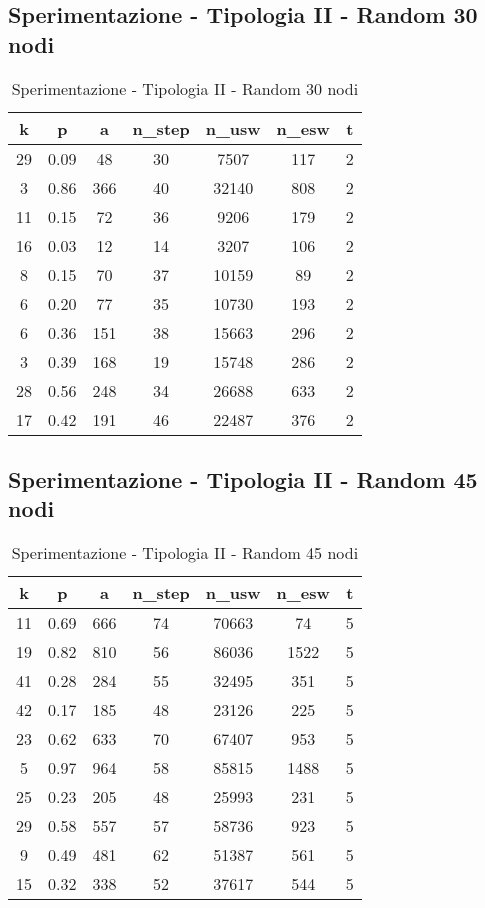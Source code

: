 \subsection{Sperimentazione - Tipologia II - Random 30 nodi}

\begin{table}[H]
\centering
\begin{tabular}{|c|c|c|c|c|c|c|}
\hline
\textbf{k} & \textbf{p} & \textbf{a} & \textbf{n\_step} & \textbf{n\_usw} & \textbf{n\_esw} & \textbf{t} \\ \hline
29 & 0.09 & 48 & 30 & 7507 & 117 & 2 \\ \hline
3 & 0.86 & 366 & 40 & 32140 & 808 & 2 \\ \hline
11 & 0.15 & 72 & 36 & 9206 & 179 & 2 \\ \hline
16 & 0.03 & 12 & 14 & 3207 & 106 & 2 \\ \hline
8 & 0.15 & 70 & 37 & 10159 & 89 & 2 \\ \hline
6 & 0.20 & 77 & 35 & 10730 & 193 & 2 \\ \hline
6 & 0.36 & 151 & 38 & 15663 & 296 & 2 \\ \hline
3 & 0.39 & 168 & 19 & 15748 & 286 & 2 \\ \hline
28 & 0.56 & 248 & 34 & 26688 & 633 & 2 \\ \hline
17 & 0.42 & 191 & 46 & 22487 & 376 & 2 \\ \hline
\end{tabular}
\caption{Sperimentazione - Tipologia II - Random 30 nodi}
\label{tab:sperimentazione-tipo1-30nodi}
\end{table}

\subsection{Sperimentazione - Tipologia II - Random 45 nodi}

\begin{table}[H]
\centering
\begin{tabular}{|c|c|c|c|c|c|c|}
\hline
\textbf{k} & \textbf{p} & \textbf{a} & \textbf{n\_step} & \textbf{n\_usw} & \textbf{n\_esw} & \textbf{t} \\ \hline
11 & 0.69 & 666 & 74 & 70663 & 74 & 5 \\ \hline
19 & 0.82 & 810 & 56 & 86036 & 1522 & 5 \\ \hline
41 & 0.28 & 284 & 55 & 32495 & 351 & 5 \\ \hline
42 & 0.17 & 185 & 48 & 23126 & 225 & 5 \\ \hline
23 & 0.62 & 633 & 70 & 67407 & 953 & 5 \\ \hline
5 & 0.97 & 964 & 58 & 85815 & 1488 & 5 \\ \hline
25 & 0.23 & 205 & 48 & 25993 & 231 & 5 \\ \hline
29 & 0.58 & 557 & 57 & 58736 & 923 & 5 \\ \hline
9 & 0.49 & 481 & 62 & 51387 & 561 & 5 \\ \hline
15 & 0.32 & 338 & 52 & 37617 & 544 & 5 \\ \hline
\end{tabular}
\caption{Sperimentazione - Tipologia II - Random 45 nodi}
\label{tab:sperimentazione-tipo1-45nodi}
\end{table}


